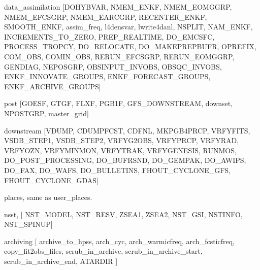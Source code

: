 data\-\_\-assimilation \mbox{[}D\-O\-H\-Y\-B\-V\-A\-R, N\-M\-E\-M\-\_\-\-E\-N\-K\-F, N\-M\-E\-M\-\_\-\-E\-O\-M\-G\-G\-R\-P, N\-M\-E\-M\-\_\-\-E\-F\-C\-S\-G\-R\-P, N\-M\-E\-M\-\_\-\-E\-A\-R\-C\-G\-R\-P, R\-E\-C\-E\-N\-T\-E\-R\-\_\-\-E\-N\-K\-F, S\-M\-O\-O\-T\-H\-\_\-\-E\-N\-K\-F, assim\-\_\-freq, l4densvar, lwrite4danl, N\-S\-P\-L\-I\-T, N\-A\-M\-\_\-\-E\-N\-K\-F, I\-N\-C\-R\-E\-M\-E\-N\-T\-S\-\_\-\-T\-O\-\_\-\-Z\-E\-R\-O, P\-R\-E\-P\-\_\-\-R\-E\-A\-L\-T\-I\-M\-E, D\-O\-\_\-\-E\-M\-C\-S\-F\-C, P\-R\-O\-C\-E\-S\-S\-\_\-\-T\-R\-O\-P\-C\-Y, D\-O\-\_\-\-R\-E\-L\-O\-C\-A\-T\-E, D\-O\-\_\-\-M\-A\-K\-E\-P\-R\-E\-P\-B\-U\-F\-R, O\-P\-R\-E\-F\-I\-X, C\-O\-M\-\_\-\-O\-B\-S, C\-O\-M\-I\-N\-\_\-\-O\-B\-S, R\-E\-R\-U\-N\-\_\-\-E\-F\-C\-S\-G\-R\-P, R\-E\-R\-U\-N\-\_\-\-E\-O\-M\-G\-G\-R\-P, G\-E\-N\-D\-I\-A\-G, N\-E\-P\-O\-S\-G\-R\-P, O\-B\-S\-I\-N\-P\-U\-T\-\_\-\-I\-N\-V\-O\-B\-S, O\-B\-S\-Q\-C\-\_\-\-I\-N\-V\-O\-B\-S, E\-N\-K\-F\-\_\-\-I\-N\-N\-O\-V\-A\-T\-E\-\_\-\-G\-R\-O\-U\-P\-S, E\-N\-K\-F\-\_\-\-F\-O\-R\-E\-C\-A\-S\-T\-\_\-\-G\-R\-O\-U\-P\-S, E\-N\-K\-F\-\_\-\-A\-R\-C\-H\-I\-V\-E\-\_\-\-G\-R\-O\-U\-P\-S\mbox{]}

post \mbox{[}G\-O\-E\-S\-F, G\-T\-G\-F, F\-L\-X\-F, P\-G\-B1\-F, G\-F\-S\-\_\-\-D\-O\-W\-N\-S\-T\-R\-E\-A\-M, downset, N\-P\-O\-S\-T\-G\-R\-P, master\-\_\-grid\mbox{]}

downstream \mbox{[}V\-D\-U\-M\-P, C\-D\-U\-M\-P\-F\-C\-S\-T, C\-D\-F\-N\-L, M\-K\-P\-G\-B4\-P\-R\-C\-P, V\-R\-F\-Y\-F\-I\-T\-S, V\-S\-D\-B\-\_\-\-S\-T\-E\-P1, V\-S\-D\-B\-\_\-\-S\-T\-E\-P2, V\-R\-F\-Y\-G2\-O\-B\-S, V\-R\-F\-Y\-P\-R\-C\-P, V\-R\-F\-Y\-R\-A\-D, V\-R\-F\-Y\-O\-Z\-N, V\-R\-F\-Y\-M\-I\-N\-M\-O\-N, V\-R\-F\-Y\-T\-R\-A\-K, V\-R\-F\-Y\-G\-E\-N\-E\-S\-I\-S, R\-U\-N\-M\-O\-S, D\-O\-\_\-\-P\-O\-S\-T\-\_\-\-P\-R\-O\-C\-E\-S\-S\-I\-N\-G, D\-O\-\_\-\-B\-U\-F\-R\-S\-N\-D, D\-O\-\_\-\-G\-E\-M\-P\-A\-K, D\-O\-\_\-\-A\-W\-I\-P\-S, D\-O\-\_\-\-F\-A\-X, D\-O\-\_\-\-W\-A\-F\-S, D\-O\-\_\-\-B\-U\-L\-L\-E\-T\-I\-N\-S, F\-H\-O\-U\-T\-\_\-\-C\-Y\-C\-L\-O\-N\-E\-\_\-\-G\-F\-S, F\-H\-O\-U\-T\-\_\-\-C\-Y\-C\-L\-O\-N\-E\-\_\-\-G\-D\-A\-S\mbox{]}

places, same as user\-\_\-places.

nsst, \mbox{[} N\-S\-T\-\_\-\-M\-O\-D\-E\-L, N\-S\-T\-\_\-\-R\-E\-S\-V, Z\-S\-E\-A1, Z\-S\-E\-A2, N\-S\-T\-\_\-\-G\-S\-I, N\-S\-T\-I\-N\-F\-O, N\-S\-T\-\_\-\-S\-P\-I\-N\-U\-P\mbox{]}

archiving \mbox{[} archive\-\_\-to\-\_\-hpss, arch\-\_\-cyc, arch\-\_\-warmicfreq, arch\-\_\-fcsticfreq, copy\-\_\-fit2obs\-\_\-files, scrub\-\_\-in\-\_\-archive, scrub\-\_\-in\-\_\-archive\-\_\-start, scrub\-\_\-in\-\_\-archive\-\_\-end, A\-T\-A\-R\-D\-I\-R \mbox{]}


